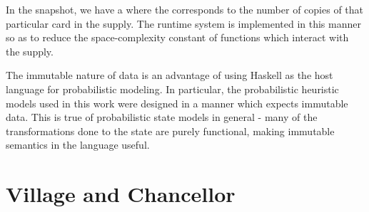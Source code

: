 In the snapshot, we have a  where
the  corresponds to the number of copies of
that particular card in the supply. The runtime system is implemented in
this manner so as to reduce the space-complexity constant of functions
which interact with the supply.

The immutable nature of data is an advantage of using Haskell as the
host language for probabilistic modeling. In particular, the probabilistic
heuristic models used in this work were designed in a manner which expects
immutable data. This is true of probabilistic state models in general - many
of the transformations done to the state are purely functional, making
immutable semantics in the language useful.

\newpage

\section{Village and Chancellor} \label{app:dominion-card}

